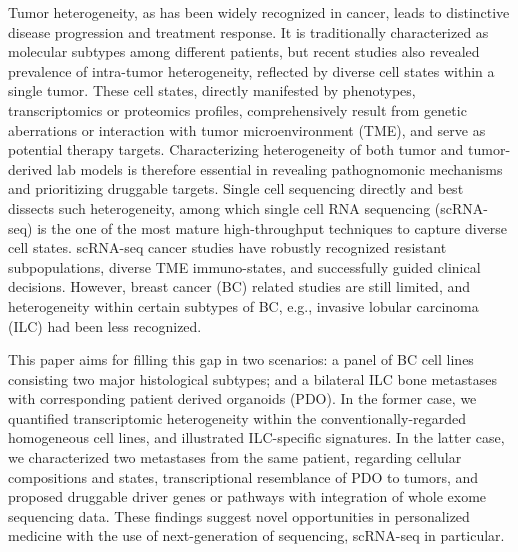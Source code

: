 \begin{abstract*}
  Tumor heterogeneity, as has been widely recognized in cancer, leads to distinctive disease progression and treatment response. It is traditionally characterized as molecular subtypes among different patients, but recent studies also revealed prevalence of intra-tumor heterogeneity, reflected by diverse cell states within a single tumor. These cell states, directly manifested by phenotypes, transcriptomics or proteomics profiles, comprehensively result from genetic aberrations or interaction with tumor microenvironment (TME), and serve as potential therapy targets. Characterizing heterogeneity of both tumor and tumor-derived lab models is therefore essential in revealing pathognomonic mechanisms and prioritizing druggable targets. Single cell sequencing directly and best dissects such heterogeneity, among which single cell RNA sequencing (scRNA-seq) is the one of the most mature high-throughput techniques to capture diverse cell states. scRNA-seq cancer studies have robustly recognized resistant subpopulations, diverse TME immuno-states, and successfully guided clinical decisions. However, breast cancer (BC) related studies are still limited, and heterogeneity within certain subtypes of BC, e.g., invasive lobular carcinoma (ILC) had been less recognized. 
  
  This paper aims for filling this gap in two scenarios: a panel of BC cell lines consisting two major histological subtypes; and a bilateral ILC bone metastases with corresponding patient derived organoids (PDO). In the former case, we quantified transcriptomic heterogeneity within the conventionally-regarded homogeneous cell lines, and illustrated ILC-specific signatures. In the latter case, we characterized two metastases from the same patient, regarding cellular compositions and states, transcriptional resemblance of PDO to tumors, and proposed druggable driver genes or pathways with integration of whole exome sequencing data. These findings suggest novel opportunities in personalized medicine with the use of next-generation of sequencing, scRNA-seq in particular.
  
\end{abstract*}
